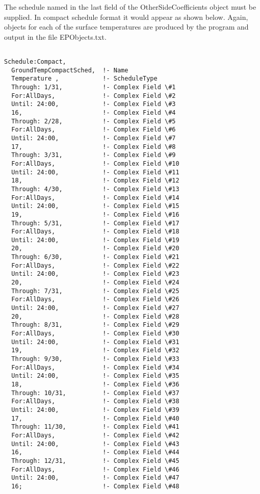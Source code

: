 The schedule named in the last field of the OtherSideCoefficients object must be supplied. In compact schedule format it would appear as shown below. Again, objects for each of the surface temperatures are produced by the program and output in the file EPObjects.txt.

\begin{lstlisting}

Schedule:Compact,
  GroundTempCompactSched,  !- Name
  Temperature ,            !- ScheduleType
  Through: 1/31,           !- Complex Field \#1
  For:AllDays,             !- Complex Field \#2
  Until: 24:00,            !- Complex Field \#3
  16,                      !- Complex Field \#4
  Through: 2/28,           !- Complex Field \#5
  For:AllDays,             !- Complex Field \#6
  Until: 24:00,            !- Complex Field \#7
  17,                      !- Complex Field \#8
  Through: 3/31,           !- Complex Field \#9
  For:AllDays,             !- Complex Field \#10
  Until: 24:00,            !- Complex Field \#11
  18,                      !- Complex Field \#12
  Through: 4/30,           !- Complex Field \#13
  For:AllDays,             !- Complex Field \#14
  Until: 24:00,            !- Complex Field \#15
  19,                      !- Complex Field \#16
  Through: 5/31,           !- Complex Field \#17
  For:AllDays,             !- Complex Field \#18
  Until: 24:00,            !- Complex Field \#19
  20,                      !- Complex Field \#20
  Through: 6/30,           !- Complex Field \#21
  For:AllDays,             !- Complex Field \#22
  Until: 24:00,            !- Complex Field \#23
  20,                      !- Complex Field \#24
  Through: 7/31,           !- Complex Field \#25
  For:AllDays,             !- Complex Field \#26
  Until: 24:00,            !- Complex Field \#27
  20,                      !- Complex Field \#28
  Through: 8/31,           !- Complex Field \#29
  For:AllDays,             !- Complex Field \#30
  Until: 24:00,            !- Complex Field \#31
  19,                      !- Complex Field \#32
  Through: 9/30,           !- Complex Field \#33
  For:AllDays,             !- Complex Field \#34
  Until: 24:00,            !- Complex Field \#35
  18,                      !- Complex Field \#36
  Through: 10/31,          !- Complex Field \#37
  For:AllDays,             !- Complex Field \#38
  Until: 24:00,            !- Complex Field \#39
  17,                      !- Complex Field \#40
  Through: 11/30,          !- Complex Field \#41
  For:AllDays,             !- Complex Field \#42
  Until: 24:00,            !- Complex Field \#43
  16,                      !- Complex Field \#44
  Through: 12/31,          !- Complex Field \#45
  For:AllDays,             !- Complex Field \#46
  Until: 24:00,            !- Complex Field \#47
  16;                      !- Complex Field \#48
\end{lstlisting}
